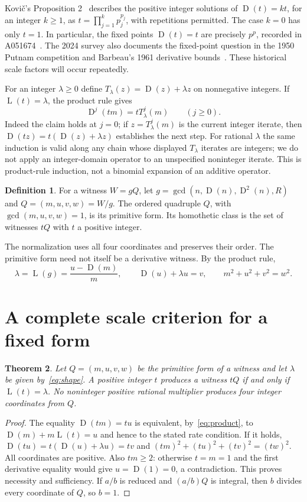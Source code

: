 \documentclass[11pt]{article}
\newcommand{\D}{\operatorname{D}}
\newcommand{\Lrate}{\operatorname{L}}
\newtheorem{theorem}{Theorem}[section]
\theoremstyle{definition}
\newtheorem{definition}[theorem]{Definition}
\begin{document}
Kovi\v{c}'s Proposition 2~\cite{kovic} describes the positive integer
solutions of $\D(t)=kt$, for an integer $k\ge1$, as
$t=\prod_{j=1}^k p_j^{p_j}$, with repetitions permitted. The case $k=0$
has only $t=1$. In particular, the fixed points $\D(t)=t$ are precisely
$p^p$, recorded in A051674~\cite{derivatives}. The 2024 survey
also documents the fixed-point question in the 1950 Putnam competition
and Barbeau's 1961 derivative bounds~\cite{overview}. These historical
scale factors will occur repeatedly.

For an integer $\lambda\ge0$ define
$T_\lambda(z)=\D(z)+\lambda z$ on nonnegative integers.
If $\Lrate(t)=\lambda$, the product rule gives
\begin{equation}\label{eq:iterate}
 \D^j(tm)=tT_\lambda^j(m)\qquad(j\ge0).
\end{equation}
Indeed the claim holds at $j=0$; if $z=T_\lambda^j(m)$ is the current
integer iterate, then $\D(tz)=t(\D(z)+\lambda z)$ establishes the next
step. For rational $\lambda$ the same induction is valid along any
chain whose displayed $T_\lambda$ iterates are integers; we do not apply
an integer-domain operator to an unspecified noninteger iterate.
This is product-rule induction, not a binomial expansion of an additive
operator.

\begin{definition}
For a witness $W=gQ$, let
$g=\gcd(n,\D(n),\D^2(n),R)$ and
$Q=(m,u,v,w)=W/g$. The ordered quadruple $Q$, with
$\gcd(m,u,v,w)=1$, is its primitive form. Its homothetic class is the set
of witnesses $tQ$ with $t$ a positive integer.
\end{definition}
The normalization uses all four coordinates and preserves their order.
The primitive form need not itself be a derivative witness.
By the product rule,
\begin{equation}\label{eq:shape}
 \lambda=\Lrate(g)=\frac{u-\D(m)}{m},\qquad
 \D(u)+\lambda u=v,\qquad m^2+u^2+v^2=w^2.
\end{equation}

\section{A complete scale criterion for a fixed form}\label{sec:scale}
\begin{theorem}\label{thm:shape}
Let $Q=(m,u,v,w)$ be the primitive form of a witness and let
$\lambda$ be given by~\eqref{eq:shape}. A positive integer $t$ produces
a witness $tQ$ if and only if $\Lrate(t)=\lambda$.
No noninteger positive rational multiplier produces four integer
coordinates from $Q$.
\end{theorem}
\begin{proof}
The equality $\D(tm)=tu$ is equivalent, by~\eqref{eq:product}, to
$\D(m)+m\Lrate(t)=u$ and hence to the stated rate condition.
If it holds, $\D(tu)=t(\D(u)+\lambda u)=tv$ and
$(tm)^2+(tu)^2+(tv)^2=(tw)^2$. All coordinates are positive. Also $tm\ge2$: otherwise $t=m=1$
and the first derivative equality would give $u=\D(1)=0$, a
contradiction. This proves necessity and sufficiency. If $a/b$ is reduced and
$(a/b)Q$ is integral, then $b$ divides every coordinate of $Q$, so $b=1$.
\end{proof}
\end{document}
